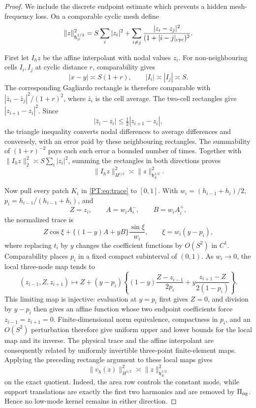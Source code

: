 \documentclass[11pt]{amsart}
\numberwithin{equation}{section}
\theoremstyle{definition}
\theoremstyle{remark}
\newcommand{\PiNG}{\Pi_{\rm ng}}
\begin{document}
\begin{proof}
We include the discrete endpoint estimate which prevents a hidden
mesh-frequency loss.  On a comparable cyclic mesh define
\begin{equation}\label{PT:eq:discrete-H}
 \|z\|_{\mathfrak h^{1/2}_S}^2
 =S\sum_i|z_i|^2
 +\sum_{i\ne j}\frac{|z_i-z_j|^2}{(1+|i-j|_{\rm cyc})^2}.
\end{equation}

First let $I_hz$ be the affine interpolant with nodal values $z_i$.
For non-neighbouring cells $I_i,I_j$ at cyclic distance $r$,
comparability gives
\[
 |x-y|\asymp S(1+r),\qquad |I_i|\asymp|I_j|\asymp S.
\]
The corresponding Gagliardo rectangle is therefore comparable with
$|\bar z_i-\bar z_j|^2/(1+r)^2$, where $\bar z_i$ is the cell average.
The two-cell rectangles give $|z_{i+1}-z_i|^2$.  Since
\[
 |\bar z_i-z_i|\le\tfrac12|z_{i+1}-z_i|,
\]
the triangle inequality converts nodal differences to average
differences and conversely, with an error paid by these neighbouring
rectangles.  The summability of $(1+r)^{-2}$ pays each such error a
bounded number of times.
Together with
$\|I_hz\|_2^2\asymp S\sum_i|z_i|^2$, summing the rectangles in both
directions proves
\begin{equation}\label{PT:eq:affine-discrete}
 \|I_hz\|_{H^{1/2}}^2\asymp
 \|z\|_{\mathfrak h^{1/2}_S}^2.
\end{equation}

Now pull every patch $K_i$ in \eqref{PT:eq:trace} to $[0,1]$.  With
$w_i=(h_{i-1}+h_i)/2$, $p_i=h_{i-1}/(h_{i-1}+h_i)$, and
\[
 Z=z_i,\qquad A=w_iA_i^-,\qquad B=w_iA_i^+,
\]
the normalized trace is
\[
 Z\cos\xi+\{(1-y)A+yB\}\frac{\sin\xi}{w_i},
 \qquad \xi=w_i(y-p_i),
\]
where replacing $t_i$ by $y$ changes the coefficient functions by
$O(S^2)$ in $C^1$.  Comparability places $p_i$ in a fixed compact
subinterval of $(0,1)$.  As $w_i\to0$, the local three-node map tends to
\begin{equation}\label{PT:eq:limiting-local-trace}
 (z_{i-1},Z,z_{i+1})\longmapsto
 Z+(y-p_i)\left\{
 (1-y)\frac{Z-z_{i-1}}{2p_i}
 +y\frac{z_{i+1}-Z}{2(1-p_i)}\right\}.
\end{equation}
This limiting map is injective: evaluation at $y=p_i$ first gives
$Z=0$, and division by $y-p_i$ then gives an affine function whose two
endpoint coefficients force $z_{i-1}=z_{i+1}=0$.  Finite-dimensional
norm equivalence, compactness in $p_i$, and an $O(S^2)$ perturbation
therefore give uniform upper and lower bounds for the local map and its
inverse.  The physical trace and the affine interpolant are consequently
related by uniformly invertible three-point finite-element maps.
Applying the preceding rectangle argument to these local maps gives
\begin{equation}\label{PT:eq:discrete-equivalence}
 \|v_h(z)\|_{H^{1/2}}^2
 \asymp\|z\|_{\mathfrak h^{1/2}_S}^2
\end{equation}
on the exact quotient.  Indeed, the area row controls the constant mode,
while support translations are exactly the first two harmonics and are
removed by $\PiNG$.  Hence no low-mode kernel remains in either direction.


\end{proof}
\end{document}
